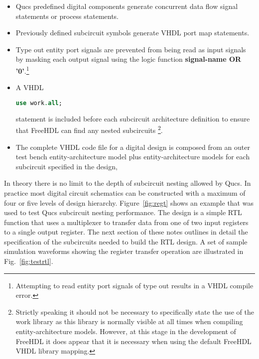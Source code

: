 \newpage 

\begin{itemize}
\item
Qucs predefined digital components generate concurrent data flow
signal statements or process statements.
\item
Previously defined subcircuit symbols generate VHDL port map
statements.
\item
 Type out entity port signals are prevented from being read as input
 signals by masking each output signal using the logic
 function  \textbf{signal-name OR '0'}.\footnote{Attempting to read
 entity port signals of type out results in a VHDL compile error. }
\item
 A VHDL \begin{lstlisting}[language=VHDL]
use work.all; \end{lstlisting}
statement is included before each subcircuit architecture definition
to ensure that FreeHDL can find any nested subcircuits
\footnote{Strictly speaking it should not be necessary to specifically
state the use of the work library as this library is normally visible
at all times when compiling entity-architecture models.  However, at
this stage in the development of FreeHDL it does appear that it is
necessary when using the default FreeHDL VHDL library mapping.}.
\item
The complete VHDL code file for a digital design is composed from an
outer test bench entity-architecture model plus entity-architecture
models for each subcircuit specified in the design,
\end{itemize}


In theory there is no limit to the depth of subcircuit nesting allowed
by Qucs.  In practice most digital circuit schematics can be
constructed with a maximum of four or five levels of design hierarchy.
Figure~\ref{fig:regt} shows an example that was used to test Qucs
subcircuit nesting performance.  The design is a simple RTL function
that uses a multiplexer to transfer data from one of two input
registers to a single output register.  The next section of these
notes outlines in detail the specification of the subcircuits needed
to build the RTL design.  A set of sample simulation waveforms showing the 
register transfer operation are illustrated in Fig.~\ref{fig:testrtl}.
\newpage 
{}

